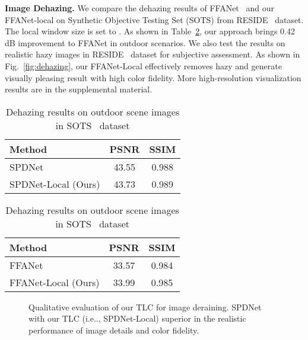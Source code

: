 \documentclass[runningheads]{llncs}
\makeatletter
\DeclareRobustCommand\onedot{\futurelet\@let@token\@onedot}
\def\@onedot{\ifx\@let@token.\else.\null\fi\xspace}
\def\ie{i.e\onedot}
\makeatother
\begin{document}
\textbf{Image Dehazing.}
We compare the dehazing results of FFANet~\cite{qin2020ffa} and our FFANet-local on Synthetic Objective Testing Set (SOTS) from RESIDE~\cite{li2018benchmarking} dataset.
The local window size is set to . 
As shown in Table~\ref{tab:SOTA.dehaze}, our approach brings 0.42 dB improvement to FFANet in outdoor scenarios.  We also test the results on realistic hazy images in RESIDE~\cite{li2018benchmarking} dataset for subjective assessment. As shown in Fig.~\ref{fig:dehazing}, our FFANet-Local effectively removes hazy and generate visually pleasing result with high color fidelity. More high-resolution visualization results are in the supplemental material.

\begin{table}[t]
\RawFloats
\setlength{\tabcolsep}{3pt}
    \parbox{.48\linewidth}{
    \centering
\caption{Deraining results on SPA-Data~\cite{wang2019spatial} dataset}
 \label{tab:SOTA.derain}
    \begin{tabular}{l|cc}
    \toprule
{Method} & {PSNR}  & {SSIM}  \\ \midrule
SPDNet~\cite{fang2020multi}& 43.55 & 0.988   \\
{SPDNet-Local (Ours)} & {43.73} & {0.989} \\ \bottomrule
\end{tabular}
    }
    \hfill
    \parbox{.48\linewidth}{
        \centering
\caption{Dehazing results on outdoor scene images in SOTS~\cite{li2018benchmarking} dataset
}
 \label{tab:SOTA.dehaze}
    \begin{tabular}{l|cc}
     \toprule
{Method} & {PSNR}            & {SSIM} \\\midrule
FFANet~\cite{qin2020ffa} & 33.57           & 0.984                 \\
{FFANet-Local (Ours)}      & {33.99}           & {0.985}        \\ \bottomrule 
\end{tabular}
}
\end{table} \begin{figure}[!t]
\centering
{}
\caption{Qualitative evaluation of our TLC for {image deraining}. SPDNet with our TLC (\ie, SPDNet-Local) superior in the realistic performance of image details and color fidelity.}
\label{fig:deraining}
\end{figure}
\end{document}
